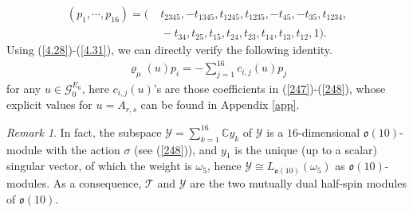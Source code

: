 \documentclass[12pt]{article}
\numberwithin{equation}{section}
\theoremstyle{definition}
\theoremstyle{remark}
\newtheorem{remark}[theorem]{Remark}
\begin{document}
\begin{align}
	(p_1,\cdots,p_{16})=(&\;t_{2345},-t_{1345},t_{1245},t_{1235},-t_{45},-t_{35},t_{1234},\nonumber\\
	&\;-t_{34},t_{25},t_{15},t_{24},t_{23},t_{14},t_{13},t_{12},1).
\end{align}
Using (\ref{4.28})-(\ref{4.31}), we can directly verify the following identity.
\begin{eqnarray}
	\varrho_{\mu}(u)p_i=-\sum_{j=1}^{16}c_{i,j}(u)p_j \label{4.34}
\end{eqnarray}
for any $u\in\mathscr{G}^{E_6}_0$, here $c_{i,j}(u)$'s are those coefficients in (\ref{247})-(\ref{248}), whose explicit values for $u=A_{r,s}$ can be found in Appendix \ref{app}. 
\begin{remark}
	In fact, the subspace $\mathcal{Y}=\sum_{k=1}^{16}\mathbb{C}y_k$ of $\mathscr{Y}$ is a $16$-dimensional $\mathfrak{o}(10)$-module with the action $\sigma$ (see (\ref{248})), and $y_1$ is the unique (up to a scalar) singular vector, of which the weight is $\omega_5$, hence $\mathcal{Y}\cong L_{\mathfrak{o}(10)}(\omega_5)$ as $\mathfrak{o}(10)$-modules. As a consequence, $\mathcal{T}$ and $\mathcal{Y}$ are the two mutually dual half-spin modules of $\mathfrak{o}(10)$.
\end{remark}
\end{document}
